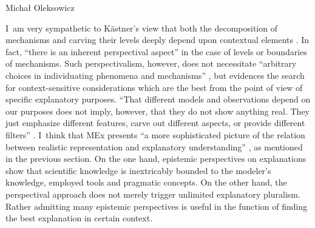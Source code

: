 \begin{artengenv}{Michał Oleksowicz}

I~am very sympathetic to Kästner's view that both the decomposition of mechanisms and carving their levels deeply depend upon contextual elements
\parencite[][pp.217–220]{woodward_comment_2008}. %
 In fact, ``there is an inherent perspectival aspect'' 
\parencite[][p.960]{darden_thinking_2008} %
 in the case of levels or boundaries of mechanisms. Such perspectivalism, however, does not necessitate ``arbitrary choices in individuating phenomena and mechanisms'' 
\parencite[][p.960]{darden_thinking_2008}, %
 but evidences the search for context-sensitive considerations which are the best from the point of view of specific explanatory purposes. ``That different models and observations depend on our purposes does not imply, however, that they do not show anything real. They just emphasize different features, carve out different aspects, or provide different filters'' 
\parencite[][p.76]{kastner_integrating_2018}. %
 I~think that MEx presents ``a more sophisticated picture of the relation between realistic representation and explanatory understanding'' 
\parencite[][p.3795]{de_regt_scientific_2015}, %
 as mentioned in the previous section. On the one hand, epistemic perspectives on explanations show that scientific knowledge is inextricably bounded to the modeler's knowledge, employed tools and pragmatic concepts. On the other hand, the perspectival approach does not merely trigger unlimited explanatory pluralism. Rather admitting many epistemic perspectives is useful in the function of finding the best explanation in certain context.


\end{artengenv}

